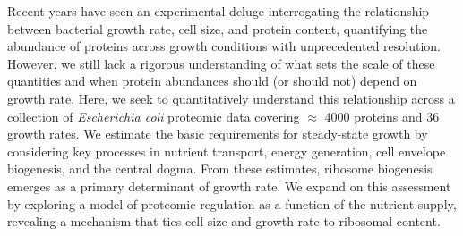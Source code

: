 Recent years have seen an experimental deluge interrogating the relationship
between bacterial growth rate, cell size, and protein content, quantifying the
abundance of proteins across growth conditions with unprecedented resolution.
However, we still lack a rigorous understanding of what sets the scale of these
quantities and when protein abundances should (or should not) depend on growth
rate. Here, we seek to quantitatively understand this relationship across a
collection of \textit{Escherichia coli} proteomic data covering $\approx$ 4000
proteins and 36 growth rates. We estimate the basic requirements for
steady-state growth by considering key processes in nutrient transport, energy
generation, cell envelope biogenesis, and the central dogma. From these
estimates, ribosome biogenesis emerges as a primary determinant of growth rate.
We expand on this assessment by exploring a model of proteomic regulation as a
function of the nutrient supply, revealing a mechanism that ties cell size and
growth rate to ribosomal content.
